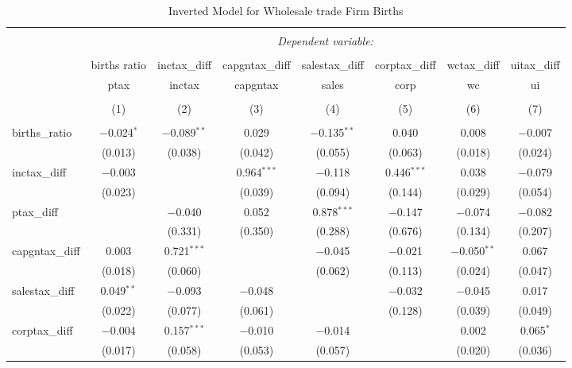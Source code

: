 
\begin{table}[!htbp] \centering 
  \caption{Inverted Model for  Wholesale trade Firm Births} 
  \label{42rd} 
\footnotesize 
\begin{tabular}{@{\extracolsep{5pt}}lccccccc} 
\\[-1.8ex]\hline 
\hline \\[-1.8ex] 
 & \multicolumn{7}{c}{\textit{Dependent variable:}} \\ 
\cline{2-8} 
\\[-1.8ex] & births ratio & inctax\_diff & capgntax\_diff & salestax\_diff & corptax\_diff & wctax\_diff & uitax\_diff \\ 
 & ptax & inctax & capgntax & sales & corp & wc & ui \\ 
\\[-1.8ex] & (1) & (2) & (3) & (4) & (5) & (6) & (7)\\ 
\hline \\[-1.8ex] 
 births\_ratio & $-$0.024$^{*}$ & $-$0.089$^{**}$ & 0.029 & $-$0.135$^{**}$ & 0.040 & 0.008 & $-$0.007 \\ 
  & (0.013) & (0.038) & (0.042) & (0.055) & (0.063) & (0.018) & (0.024) \\ 
  inctax\_diff & $-$0.003 &  & 0.964$^{***}$ & $-$0.118 & 0.446$^{***}$ & 0.038 & $-$0.079 \\ 
  & (0.023) &  & (0.039) & (0.094) & (0.144) & (0.029) & (0.054) \\ 
  ptax\_diff &  & $-$0.040 & 0.052 & 0.878$^{***}$ & $-$0.147 & $-$0.074 & $-$0.082 \\ 
  &  & (0.331) & (0.350) & (0.288) & (0.676) & (0.134) & (0.207) \\ 
  capgntax\_diff & 0.003 & 0.721$^{***}$ &  & $-$0.045 & $-$0.021 & $-$0.050$^{**}$ & 0.067 \\ 
  & (0.018) & (0.060) &  & (0.062) & (0.113) & (0.024) & (0.047) \\ 
  salestax\_diff & 0.049$^{**}$ & $-$0.093 & $-$0.048 &  & $-$0.032 & $-$0.045 & 0.017 \\ 
  & (0.022) & (0.077) & (0.061) &  & (0.128) & (0.039) & (0.049) \\ 
  corptax\_diff & $-$0.004 & 0.157$^{***}$ & $-$0.010 & $-$0.014 &  & 0.002 & 0.065$^{*}$ \\ 
  & (0.017) & (0.058) & (0.053) & (0.057) &  & (0.020) & (0.036) \\ 

\end{tabular}
\end{table}
